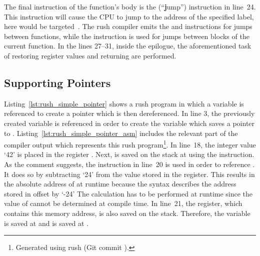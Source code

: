 The final instruction of the  function's body is the  (\enquote{\textbf{j}ump}) instruction in line~24.
This instruction will cause the CPU to jump to the address of the specified label,
here  would be targeted~\cite[p.~17]{Patterson2017}.
The rush compiler emits the  and  instructions for jumps between functions,
while the  instruction is used for jumps between blocks of the current function.
In the lines 27--31, inside the epilogue, the aforementioned task of restoring register values and returning are performed.

\subsection{Supporting Pointers}

\noindent
\begin{minipage}{.34\textwidth}
	\centering
\end{minipage}%
\hspace{3cm}
\begin{minipage}{.45\textwidth}
	\centering
	\vspace{.1cm}
\end{minipage}

Listing~\ref{lst:rush_simple_pointer} shows a rush program in which a variable is referenced to create a pointer which is then dereferenced.
In line 3, the previously created variable  is referenced in order to create the variable  which saves a pointer to .
Listing~\ref{lst:rush_simple_pointer_asm} includes the relevant part of the compiler output which represents this rush program\footnote{Generated using rush (Git commit \rushCommit{}).}.
In line~18, the integer value `42' is placed in the register .
Next,  is saved on the stack at  using the  instruction.
As the comment suggests, the instruction in line~20 is used in order to reference .
It does so by subtracting `24' from the value stored in the  register.
This results in the absolute address of  at runtime because the syntax  describes the address stored in  offset by `-24'
The calculation has to be performed at runtime since the value of  cannot be determined at compile time.
In line~21, the  register, which contains this memory address, is also saved on the stack.
Therefore, the  variable is saved at  and  is saved at .

